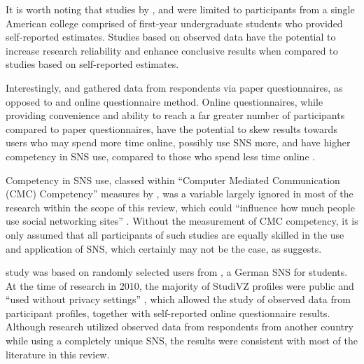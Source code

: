 It is worth noting that studies by \citet{Raacke2008}, \citet{Muscanell2012} and \citet{Joiner2014} were limited to participants from a single American college comprised of first-year undergraduate students who provided self-reported estimates. Studies based on observed data have the potential to increase research reliability and enhance conclusive results when compared to studies based on self-reported estimates.

Interestingly, \citet{Raacke2008} and \citet{Joiner2014} gathered data from respondents via paper questionnaires, as opposed to  and  online questionnaire method. Online questionnaires, while providing convenience and ability to reach a far greater number of participants compared to paper questionnaires, have the potential to skew results towards users who may spend more time online, possibly use SNS more, and have higher competency in SNS use, compared to those who spend less time online \citep[p. 280]{Hargittai2007}.

Competency in SNS use, classed within ``Computer Mediated Communication (CMC) Competency'' measures by \citet[p. 579]{Ross2009}, was a variable largely ignored in most of the research within the scope of this review, which could ``influence how much people use social networking sites'' \citep[p. 898]{Kimbrough2013}. Without the measurement of CMC competency, it is only assumed that all participants of such studies are equally skilled in the use and application of SNS, which certainly may not be the case, as \citet{Ross2009} suggests.


 study was based on randomly selected users from \citet{StudiVZ2014}, a German SNS for students. At the time of research in 2010, the majority of StudiVZ profiles were public and ``used without privacy settings'' \citep[p. 92]{Haferkamp2012}, which allowed the study of observed data from participant profiles, together with self-reported online questionnaire results. Although  research utilized observed data from respondents from another country while using a completely unique SNS, the results were consistent with most of the literature in this review.